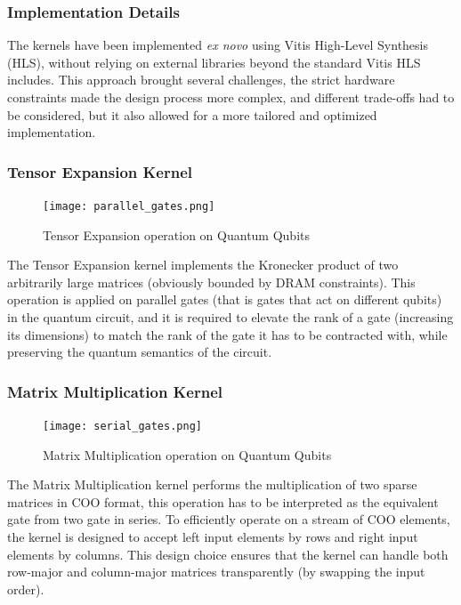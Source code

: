 \documentclass[12pt,oneside,a4paper]{article}
\begin{document}
\subsubsection{Implementation Details}

The kernels have been implemented \textit{ex novo} using Vitis High-Level Synthesis (HLS), without relying on external libraries beyond the standard Vitis HLS includes. This approach brought several challenges, the strict hardware constraints made the design process more complex, and different trade-offs had to be considered, but it also allowed for a more tailored and optimized implementation.

\subsubsection{Tensor Expansion Kernel}

\begin{figure}[h]
    \centering
    \texttt{[image: parallel\_gates.png]}
    \caption{Tensor Expansion operation on Quantum Qubits}
    \label{fig:tensor-expansion}
\end{figure}

The Tensor Expansion kernel implements the Kronecker product of two arbitrarily large matrices (obviously bounded by DRAM constraints). This operation is applied on parallel gates (that is gates that act on different qubits) in the quantum circuit, and it is required to elevate the rank of a gate (increasing its dimensions) to match the rank of the gate it has to be contracted with, while preserving the quantum semantics of the circuit.

\subsubsection{Matrix Multiplication Kernel}

\begin{figure}[h]
    \centering
    \texttt{[image: serial\_gates.png]}
    \caption{Matrix Multiplication operation on Quantum Qubits}
    \label{fig:matrix-multiplication}
\end{figure}

The Matrix Multiplication kernel performs the multiplication of two sparse matrices in COO format, this operation has to be interpreted as the equivalent gate from two gate in series. To efficiently operate on a stream of COO elements, the kernel is designed to accept left input elements by rows and right input elements by columns. This design choice ensures that the kernel can handle both row-major and column-major matrices transparently (by swapping the input order).
\end{document}
